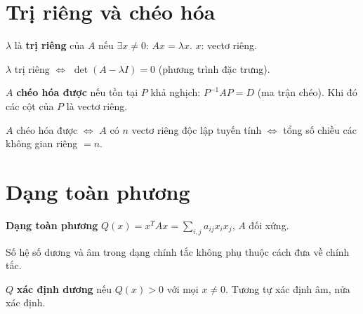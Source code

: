 \documentclass[12pt,a4paper]{article}
\begin{document}
\section{Trị riêng và chéo hóa}

\begin{dinhnghia}
  $\lambda$ là \textbf{trị riêng} của $A$ nếu $\exists x \ne 0$: $Ax = \lambda x$. $x$: vectơ riêng.
\end{dinhnghia}

\begin{congthuc}
  $\lambda$ trị riêng $\Leftrightarrow$ $\det(A - \lambda I) = 0$ (phương trình đặc trưng).
\end{congthuc}

\begin{dinhnghia}
  $A$ \textbf{chéo hóa được} nếu tồn tại $P$ khả nghịch: $P^{-1}AP = D$ (ma trận chéo). Khi đó các cột của $P$ là vectơ riêng.
\end{dinhnghia}

\begin{dinhly}
  $A$ chéo hóa được $\Leftrightarrow$ $A$ có $n$ vectơ riêng độc lập tuyến tính $\Leftrightarrow$ tổng số chiều các không gian riêng $= n$.
\end{dinhly}

\section{Dạng toàn phương}

\begin{dinhnghia}
  \textbf{Dạng toàn phương} $Q(x) = x^T A x = \sum_{i,j} a_{ij} x_i x_j$, $A$ đối xứng.
\end{dinhnghia}

\begin{dinhly}[title={Luật quán tính Sylvester}]
  Số hệ số dương và âm trong dạng chính tắc không phụ thuộc cách đưa về chính tắc.
\end{dinhly}

\begin{dinhnghia}
  $Q$ \textbf{xác định dương} nếu $Q(x) > 0$ với mọi $x \ne 0$. Tương tự xác định âm, nửa xác định.
\end{dinhnghia}
\end{document}
